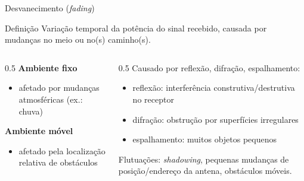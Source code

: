 \documentclass[aspectratio=169,11pt]{beamer}
\begin{document}
\begin{frame}{Desvanecimento (\emph{fading})}
  \begin{block}{Definição}
    Variação temporal da potência do sinal recebido, causada por mudanças no meio ou no(s) caminho(s).
  \end{block}
  \begin{columns}
    \begin{column}{0.5\textwidth}
      \textbf{Ambiente fixo}
      \begin{itemize}
        \item afetado por mudanças atmosféricas (ex.: chuva)
      \end{itemize}
      \textbf{Ambiente móvel}
      \begin{itemize}
        \item afetado pela localização relativa de obstáculos
      \end{itemize}
    \end{column}
    \begin{column}{0.5\textwidth}
      Causado por reflexão, difração, espalhamento:
      \begin{itemize}
        \item reflexão: interferência construtiva/destrutiva no receptor
        \item difração: obstrução por superfícies irregulares
        \item espalhamento: muitos objetos pequenos
      \end{itemize}
      Flutuações: \emph{shadowing}, pequenas mudanças de posição/endereço da antena, obstáculos móveis.
    \end{column}
  \end{columns}
\end{frame}
\end{document}
